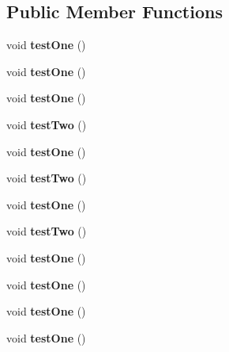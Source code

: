 \subsection*{Public Member Functions}
\begin{DoxyCompactItemize}
\item 
\hypertarget{classSuite_ac6f0f55e819f6fd76f838b0b8642e2f7}{void {\bfseries test\-One} ()}\label{classSuite_ac6f0f55e819f6fd76f838b0b8642e2f7}

\item 
\hypertarget{classSuite_ac6f0f55e819f6fd76f838b0b8642e2f7}{void {\bfseries test\-One} ()}\label{classSuite_ac6f0f55e819f6fd76f838b0b8642e2f7}

\item 
\hypertarget{classSuite_ac6f0f55e819f6fd76f838b0b8642e2f7}{void {\bfseries test\-One} ()}\label{classSuite_ac6f0f55e819f6fd76f838b0b8642e2f7}

\item 
\hypertarget{classSuite_afb37902b6507e2301601ea475b82dea3}{void {\bfseries test\-Two} ()}\label{classSuite_afb37902b6507e2301601ea475b82dea3}

\item 
\hypertarget{classSuite_ac6f0f55e819f6fd76f838b0b8642e2f7}{void {\bfseries test\-One} ()}\label{classSuite_ac6f0f55e819f6fd76f838b0b8642e2f7}

\item 
\hypertarget{classSuite_afb37902b6507e2301601ea475b82dea3}{void {\bfseries test\-Two} ()}\label{classSuite_afb37902b6507e2301601ea475b82dea3}

\item 
\hypertarget{classSuite_ac6f0f55e819f6fd76f838b0b8642e2f7}{void {\bfseries test\-One} ()}\label{classSuite_ac6f0f55e819f6fd76f838b0b8642e2f7}

\item 
\hypertarget{classSuite_afb37902b6507e2301601ea475b82dea3}{void {\bfseries test\-Two} ()}\label{classSuite_afb37902b6507e2301601ea475b82dea3}

\item 
\hypertarget{classSuite_ac6f0f55e819f6fd76f838b0b8642e2f7}{void {\bfseries test\-One} ()}\label{classSuite_ac6f0f55e819f6fd76f838b0b8642e2f7}

\item 
\hypertarget{classSuite_ac6f0f55e819f6fd76f838b0b8642e2f7}{void {\bfseries test\-One} ()}\label{classSuite_ac6f0f55e819f6fd76f838b0b8642e2f7}

\item 
\hypertarget{classSuite_ac6f0f55e819f6fd76f838b0b8642e2f7}{void {\bfseries test\-One} ()}\label{classSuite_ac6f0f55e819f6fd76f838b0b8642e2f7}

\item 
\hypertarget{classSuite_ac6f0f55e819f6fd76f838b0b8642e2f7}{void {\bfseries test\-One} ()}\label{classSuite_ac6f0f55e819f6fd76f838b0b8642e2f7}

\end{DoxyCompactItemize}


